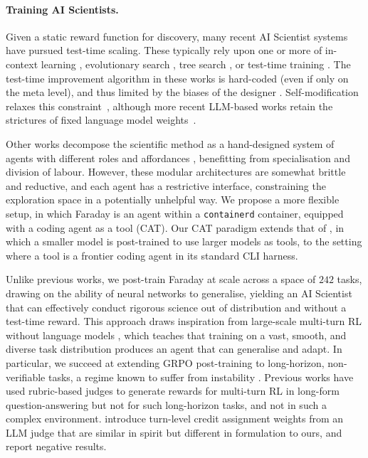 \documentclass[garamond,a4paper]{inherent}
\begin{document}
\paragraph{Training AI Scientists.}
Given a static reward function for discovery, many recent AI Scientist systems have pursued test-time scaling.
These typically rely upon one or more of in-context learning \citep{yang2024large}, evolutionary search \citep{lehman2023evolution, shinkaevolve,aira2}, tree search \citep{aide,aira1,wider-or-deeper}, or test-time training \citep{evotune,cycleresearcher,yang2026reinforcement}.
The test-time improvement algorithm in these works is hard-coded (even if only on the meta level), and thus limited by the biases of the designer \citep{sutton2019bitterlesson}.
Self-modification relaxes this constraint~\citep{schmidhuber1993self,kirsch2022eliminating}, although more recent LLM-based works retain the strictures of fixed language model weights~\citep{zelikman2023self,darwingodelmachine,wang2025huxley,zhang2026hyperagents}.

Other works decompose the scientific method as a hand-designed system of agents with different roles and affordances \citep{ai-researcher, gottweis2025towards, ghafarollahi2025sciagents, ghareeb2026multi}, benefitting from specialisation and division of labour.
However, these modular architectures are somewhat brittle and reductive, and each agent has a restrictive interface, constraining the exploration space in a potentially unhelpful way.
We propose a more flexible setup, in which Faraday is an agent within a \texttt{containerd} container, equipped with a coding agent as a tool (CAT). Our CAT paradigm extends that of \cite{su2025toolorchestra, nielsen2026learning}, in which a smaller model is post-trained to use larger models as tools, to the setting where a tool is a frontier coding agent in its standard CLI harness.

Unlike previous works, we post-train Faraday at scale across a space of $242$ tasks, drawing on the ability of neural networks to generalise, yielding an AI Scientist that can effectively conduct rigorous science out of distribution and without a test-time reward.
This approach draws inspiration from large-scale multi-turn RL without language models \citep{team2021open,ada}, which teaches that training on a vast, smooth, and diverse task distribution produces an agent that can generalise and adapt.
In particular, we succeed at extending GRPO \citep{shao2024deepseekmath} post-training to long-horizon, non-verifiable tasks, a regime known to suffer from instability \citep{xu2025renorm,wang2026arlarena,kim2026horizon}. 
Previous works have used rubric-based judges to generate rewards for multi-turn RL in long-form question-answering \citep{li2026rubricem, shao2025dr} but not for such long-horizon tasks, and not in such a complex environment. 
\cite{xie2026tips} introduce turn-level credit assignment weights from an LLM judge that are similar in spirit but different in formulation to ours, and report negative results. 
\end{document}
